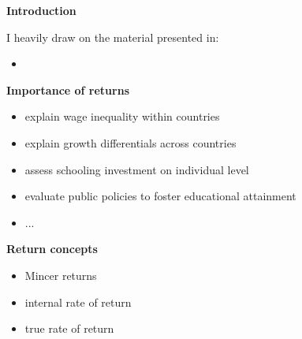 \begin{frame}\begin{center}
\LARGE\textbf{Introduction}
\end{center}\end{frame}
\begin{frame} I heavily draw on the material presented in:

\begin{itemize}
\item {}
\end{itemize}

\end{frame}
\begin{frame}\textbf{Importance of returns}\vspace{0.3cm}

\begin{itemize}\setlength\itemsep{1em}
\item explain wage inequality within countries
\item explain growth differentials across countries
\item assess schooling investment on individual level
\item evaluate public policies to foster educational attainment
\item ...
\end{itemize}
\end{frame}
\begin{frame}\textbf{Return concepts}\vspace{0.3cm}

\begin{itemize}\setlength\itemsep{1em}
\item Mincer returns
\item internal rate of return
\item true rate of return
\end{itemize}
\end{frame}
